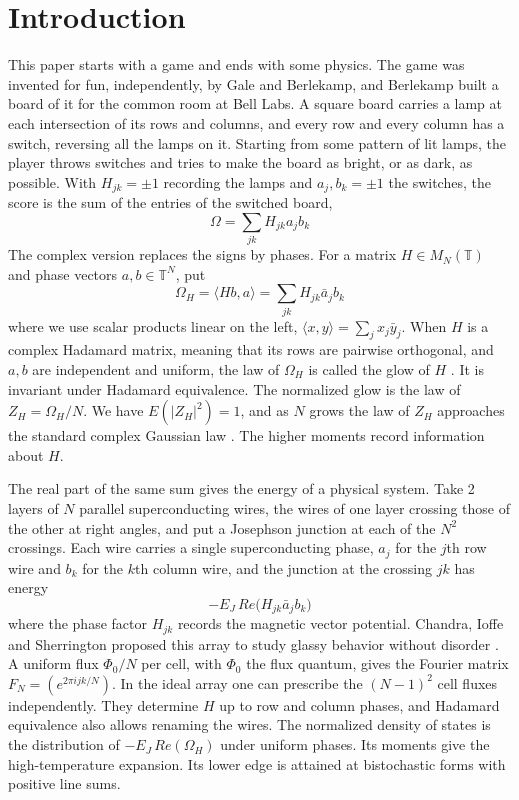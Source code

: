 \documentclass[11pt,a4paper]{article}
\theoremstyle{remark}
\begin{document}
\section*{Introduction}
This paper starts with a game and ends with some physics. The game was invented for fun, independently, by Gale and Berlekamp, and Berlekamp built a board of it for the common room at Bell Labs. A square board carries a lamp at each intersection of its rows and columns, and every row and every column has a switch, reversing all the lamps on it. Starting from some pattern of lit lamps, the player throws switches and tries to make the board as bright, or as dark, as possible. With $H_{jk}=\pm1$ recording the lamps and $a_j,b_k=\pm1$ the switches, the score is the sum of the entries of the switched board,
\[
 \Omega=\sum_{jk}H_{jk}a_jb_k
\]
The complex version replaces the signs by phases. For a matrix $H\in M_N(\mathbb T)$ and phase vectors $a,b\in\mathbb T^N$, put
\[
 \Omega_H=\langle Hb,a\rangle=\sum_{jk}H_{jk}\bar a_jb_k
\]
where we use scalar products linear on the left, $\langle x,y\rangle=\sum_jx_j\bar y_j$. When $H$ is a complex Hadamard matrix, meaning that its rows are pairwise orthogonal, and $a,b$ are independent and uniform, the law of $\Omega_H$ is called the glow of $H$ \cite{banica}. It is invariant under Hadamard equivalence. The normalized glow is the law of $Z_H=\Omega_H/N$. We have $E(|Z_H|^2)=1$, and as $N$ grows the law of $Z_H$ approaches the standard complex Gaussian law \cite{banica}. The higher moments record information about $H$.

The real part of the same sum gives the energy of a physical system. Take 2 layers of $N$ parallel superconducting wires, the wires of one layer crossing those of the other at right angles, and put a Josephson junction at each of the $N^2$ crossings. Each wire carries a single superconducting phase, $a_j$ for the $j$th row wire and $b_k$ for the $k$th column wire, and the junction at the crossing $jk$ has energy
\[
 -E_J\,Re\big(H_{jk}\bar a_jb_k\big)
\]
where the phase factor $H_{jk}$ records the magnetic vector potential. Chandra, Ioffe and Sherrington proposed this array to study glassy behavior without disorder \cite{cis}. A uniform flux $\Phi_0/N$ per cell, with $\Phi_0$ the flux quantum, gives the Fourier matrix $F_N=(e^{2\pi ijk/N})$. In the ideal array one can prescribe the $(N-1)^2$ cell fluxes independently. They determine $H$ up to row and column phases, and Hadamard equivalence also allows renaming the wires. The normalized density of states is the distribution of $-E_J\,Re(\Omega_H)$ under uniform phases. Its moments give the high-temperature expansion. Its lower edge is attained at bistochastic forms with positive line sums.
\end{document}
